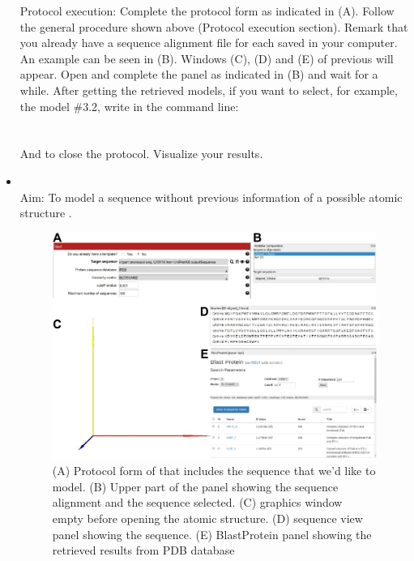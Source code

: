 \begin{itemize}
                Protocol execution: Complete the protocol form as indicated in  (A). Follow the general procedure shown above (Protocol execution section). Remark that you already have a sequence alignment file for each  saved in your computer. An example can be seen in  (B). Windows (C), (D) and (E) of previous  will appear. Open and complete the  panel as indicated in (B) and wait for a while. After getting the retrieved models, if you want to select, for example, the  model {\#3.2}, write in the command line:\\
                \\
                \\
                And \chimera {} to close the protocol. Visualize your results.
                            
                \item {}\\
                Aim: To model a  sequence without previous information of a possible atomic structure .

 
                            \begin{figure}[H]
                            \centering 
                            \captionsetup{width=.8\linewidth} 
                            \includegraphics[width=.9\textwidth]{Images_appendix/Fig308.pdf}
                            \caption{(A) Protocol form of  that includes the  sequence that we'd like to model. (B) Upper part of the \chimera {} panel showing the sequence alignment and the  sequence selected. (C) \chimera graphics window empty before opening the  atomic structure. (D) \chimera sequence view panel showing the  sequence. (E) \chimera BlastProtein panel showing the retrieved results from PDB database}
                            \label{fig:app_protocol_seqHomology_5} 
                            \end{figure}
                            

\end{itemize}
